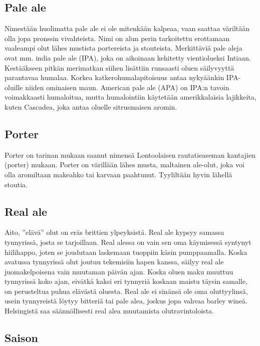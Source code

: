 \documentclass[a4paper,11pt]{report}
\begin{document}
\subsection*{Pale ale}

Nimestään huolimatta pale ale ei ole mitenkään kalpeaa, vaan saattaa väriltään olla jopa pronssin vivahteista. Nimi on alun perin tarkoitettu erottamaan vaaleampi olut lähes mustista portereista ja stouteista. Merkittäviä pale aleja ovat mm. india pale ale (IPA), joka on aikoinaan kehitetty vientiolueksi Intiaan. Kestääkseen pitkän merimatkan siihen lisättiin runsaasti oluen säilyvyyttä parantavaa humalaa. Korkea katkerohumalapitoisuus antaa nykyäänkin IPA-oluille niiden ominaisen maun. American pale ale (APA) on IPA:n tavoin voimakkaasti humaloitua, mutta humalointiin käytetään amerikkalaisia lajikkeita, kuten Cascadea, joka antaa oluelle sitrusmaisen aromin.

\subsection*{Porter}

Porter on tarinan mukaan saanut nimensä Lontoolaisen rautatieaseman kantajien (porter) mukaan. Porter on värillään lähes musta, maltainen ale-olut, joka voi olla aromiltaan makeahko tai karvaan paahtunut. Tyyliltään hyvin lähellä stoutia.

\subsection*{Real ale}

Aito, ''elävä'' olut on eräs brittien ylpeyksistä. Real ale kypsyy samassa tynnyrissä, josta se tarjoillaan. Real alessa on vain sen oma käymisessä syntynyt hiilihappo, joten se joudutaan laskemaan tuoppiin käsin pumppaamalla. Koska avatussa tynnyrissä olut joutuu tekemisiin hapen kanssa, säilyy real ale juomakelpoisena vain muutaman päivän ajan. Koska oluen maku muuttuu tynnyrissä koko ajan, eivätkä kaksi eri tynnyriä koskaan maistu täysin samalle, on perusteltua puhua elävästä oluesta. Real ale ei sinänsä ole oma oluttyylinsä, usein tynnyreistä löytyy bitteriä tai pale alea, joskus jopa vahvaa barley wineä. Helsingistä saa säännöllisesti real alea muutamista olutravintoloista.

\subsection*{Saison}
\end{document}
